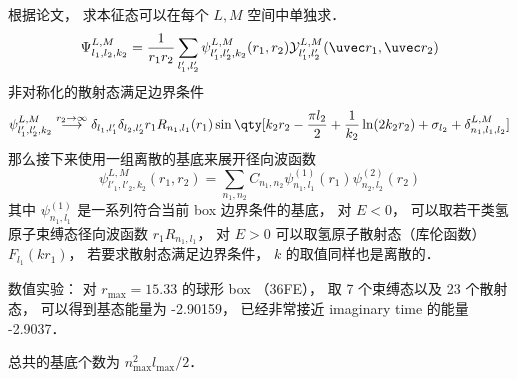 
\begin{issues}
\issueDraft
\end{issues}

根据论文， 求本征态可以在每个 $L,M$ 空间中单独求．
\begin{equation}
\Psi_{l_1,l_2,k_2}^{L,M} = \frac{1}{r_1 r_2}\sum_{l'_1, l'_2}  \psi_{l'_1, l'_2, k_2}^{L, M}(r_1, r_2)\mathcal{Y}_{l'_1, l'_2}^{L, M}(\uvec r_1, \uvec r_2)
\end{equation}
非对称化的散射态满足边界条件
\begin{equation}
\psi_{l'_1,l'_2,k_2}^{L, M} \overset{r_2\to\infty}{\longrightarrow} \delta_{l_1,l'_1}\delta_{l_2,l'_2} r_1 R_{n_1,l_1}(r_1)
\sin\qty[k_2 r_2 - \frac{\pi l_2}{2} +\frac{1}{k_2}\ln(2k_2 r_2) + \sigma_{l_2} + \delta_{n_1,l_1,l_2}^{L,M}]
\end{equation}
那么接下来使用一组离散的基底来展开径向波函数
\begin{equation}
\psi_{l'_1, l'_2,k_2}^{L, M}(r_1, r_2) = \sum_{n_1,n_2} C_{n_1,n_2} \psi_{n_1,l_1}^{(1)}(r_1) \psi_{n_2,l_2}^{(2)}(r_2)
\end{equation}
其中 $\psi_{n_1,l_1}^{(1)}$ 是一系列符合当前 box 边界条件的基底， 对 $E < 0$， 可以取若干类氢原子束缚态径向波函数 $r_1 R_{n_1, l_1}$， 对 $E > 0$ 可以取氢原子散射态（库伦函数） $F_{l_1}(kr_1)$， 若要求散射态满足边界条件， $k$ 的取值同样也是离散的．

数值实验： 对 $r_\text{max} = 15.33$ 的球形 box （36FE）， 取 7 个束缚态以及 23 个散射态， 可以得到基态能量为 -2.90159， 已经非常接近 imaginary time 的能量 -2.9037．

总共的基底个数为 $n_\text{max}^2 l_\text{max}/2$．
